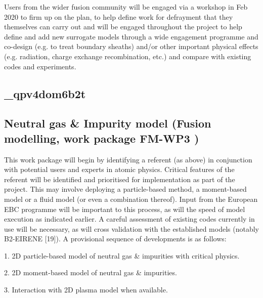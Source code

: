 \documentclass{article}
\begin{document}
\vspace{14pt}
\leftskip=-14pt
Users from the wider fusion community will be engaged via a workshop in Feb 2020 
to firm up on the plan, to help define work for defrayment that they themselves 
can carry out and will be engaged throughout the project to help define and add 
new surrogate models through a wide engagement programme and co-design (e.g. to 
treat boundary sheaths) and/or other important physical effects (e.g. radiation, 
charge exchange recombination, etc.) and compare with existing codes and experiments. 
\label{}

\vspace{2pt}
\subsection*{{\color{color20} \textbf{\_qpv4dom6b2t}}}

\vspace{2pt}
\subsection*{{\color{color25} \textbf{Neutral gas \& Impurity model}}{\color{color25}  
(Fusion modelling, work package }{\color{color25} \textbf{FM-WP3}}{\color{color25} )}}

\vspace{14pt}
This work package will begin by identifying a referent (as above) in conjunction 
with potential users and experts in atomic physics. Critical features of the referent 
will be identified and prioritised for implementation as part of the project. This 
may involve deploying a particle-based method, a moment-based model or a fluid 
model (or even a combination thereof). Input from the European EBC programme will 
be important to this process, as will the speed of model execution as indicated 
earlier. A careful assessment of existing codes currently in use {\color{color29} will 
be necessary, as will cross validation with the established models (notably B2-EIRENE 
[19]). A provisional }sequence of developments is as follows:

\vspace{14pt}
\leftskip=0pt
1. 2D particle-based model of neutral gas \& impurities with critical physics.

\vspace{2pt}
2. 2D moment-based model of neutral gas \& impurities.

\vspace{2pt}
3. Interaction with 2D plasma model when available.
\end{document}
